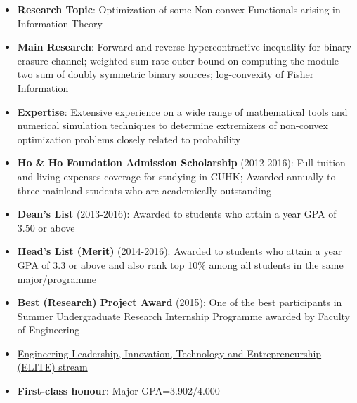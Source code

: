 \documentclass[8pt,a4paper,ragged2e,withhyper]{altacv}
\begin{document}
\begin{itemize}
\item \textbf{Research Topic}: Optimization of some Non-convex Functionals arising in Information Theory
\item \textbf{Main Research}: Forward and reverse-hypercontractive inequality for binary erasure channel; weighted-sum rate outer bound on computing the module-two sum of doubly symmetric binary sources; log-convexity of Fisher Information
\item \textbf{Expertise}: Extensive experience on a wide range of mathematical tools and numerical simulation techniques to determine extremizers of non-convex optimization problems closely related to probability  
\end{itemize}
\divider
\begin{itemize}
    \item \textbf{Ho \& Ho Foundation Admission Scholarship} (2012-2016): Full tuition and living expenses coverage for studying in CUHK; Awarded annually to three mainland students who are academically outstanding%
    \item \textbf{Dean's List} (2013-2016): Awarded to students who attain a year GPA of 3.50 or above
    \item \textbf{Head's List (Merit)} (2014-2016): Awarded to students who attain a year GPA of 3.3 or above and also rank top 10\% among all students in the same major/programme
    \item \textbf{Best (Research) Project Award} (2015): One of the best participants in Summer Undergraduate Research Internship Programme awarded by Faculty of Engineering
    \item \href{https://www.erg.cuhk.edu.hk/erg/Elite}{Engineering Leadership, Innovation, Technology and Entrepreneurship (ELITE) stream}
    \item \textbf{First-class honour}: Major GPA=3.902/4.000
\end{itemize}
\end{document}
